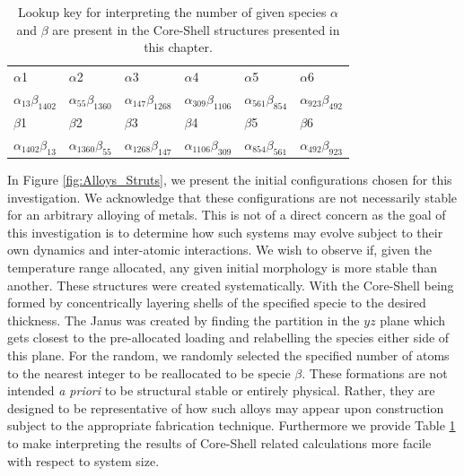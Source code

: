 \begin{table}
\centering
\caption{Lookup key for interpreting the number of given species $\alpha$ and $\beta$ are present in the Core-Shell structures presented in this chapter.}
\label{tab:cs_lookup}
\begin{tabular}{llllll}
\toprule
$\alpha$1                 & $\alpha$2                 & $\alpha$3                  & $\alpha$4                  & $\alpha$5                 & $\alpha$6                \\
$\alpha_{13}\beta_{1402}$ & $\alpha_{55}\beta_{1360}$ & $\alpha_{147}\beta_{1268}$ & $\alpha_{309}\beta_{1106}$ & $\alpha_{561}\beta_{854}$ & $\alpha_{923}\beta_{492}$ \\
\hline
$\beta$1                  & $\beta$2                  & $\beta$3                  & $\beta$4                   & $\beta$5                  & $\beta$6                  \\
$\alpha_{1402}\beta_{13}$ & $\alpha_{1360}\beta_{55}$ & $\alpha_{1268}\beta_{147}$ & $\alpha_{1106}\beta_{309}$ & $\alpha_{854}\beta_{561}$ & $\alpha_{492}\beta_{923}$ \\
\bottomrule
\end{tabular}%
\end{table}

In Figure \ref{fig:Alloys_Struts}, we present the initial configurations chosen for this investigation. We acknowledge that these configurations are not necessarily stable for an arbitrary alloying of metals. This is not of a direct concern as the goal of this investigation is to determine how such systems may evolve subject to their own dynamics and inter-atomic interactions. We wish to observe if, given the temperature range allocated, any given initial morphology is more stable than another. These structures were created systematically. With the Core-Shell being formed by concentrically layering shells of the specified specie to the desired thickness. The Janus was created by finding the partition in the $yz$ plane which gets closest to the pre-allocated loading and relabelling the species either side of this plane. For the random, we randomly selected the specified number of atoms to the nearest integer to be reallocated to be specie $\beta$. These formations are not intended \textit{a priori} to be structural stable or entirely physical. Rather, they are designed to be representative of how such alloys may appear upon construction subject to the appropriate fabrication technique. Furthermore we provide Table \ref{tab:cs_lookup} to make interpreting the results of Core-Shell related calculations more facile with respect to system size. 

